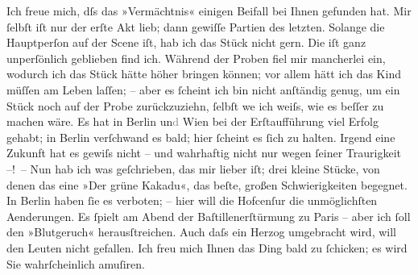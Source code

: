 \pstart
           Ich freue mich, dſs das »Vermächtnis« einigen
               Beifall bei Ihnen gefunden hat. Mir{ }ſelbſt iſt nur der erſte Akt lieb; dann gewiſſe
               Partien des letzten. Solange die Hauptperſon auf der Scene iſt, hab ich das Stück
               nicht gern. Die iſt ganz unperſönlich geblieben find ich. Während der Proben fiel mir
               mancherlei ein, wodurch ich das Stück hätte höher bringen können; vor allem hätt ich
               das Kind {\pb}müſſen am Leben laſſen; – aber es{ }ſcheint ich bin nicht anſtändig genug, um ein Stück noch auf der Probe zurückzuziehn,{ }ſelbſt we{\geminationn} ich weiſs, wie es beſſer zu machen wäre. Es
               hat in Berlin un\textcolor{gray}{d}{ }Wien bei der Erſtaufführung viel Erfolg gehabt; in
                  Berlin verſchwand es bald; hier{ }ſcheint es{ }ſich zu halten. Irgend eine Zukunft hat es gewiſs nicht – und wahrhaftig nicht nur
               wegen{ }ſeiner Traurigkeit –! – Nun hab ich was geſchrieben, das mir lieber iſt; drei
               kleine Stücke, von denen das {\pb}eine »Der grüne Kakadu«, das beſte, großen
               Schwierigkeiten begegnet. In Berlin haben{ }ſie es
               verboten; – hier will die Hofcenſur die unmöglichſten Aenderungen. Es{ }ſpielt am Abend
               der Baſtillenerſtürmung zu Paris – aber ich{ }ſoll den »Blutgeruch« herausſtreichen. Auch
               daſs ein Herzog umgebracht wird, will den Leuten nicht gefallen. Ich freu mich Ihnen
               das Ding bald zu{ }ſchicken; es wird Sie wahrſcheinlich amuſiren.\pend
           
